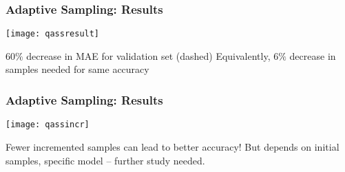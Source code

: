 \begin{frame}
    \frametitle{Adaptive Sampling: Results}
    \vspace{-10pt}
    \begin{center}
    \texttt{[image: qassresult]}
    \end{center}
    
    $60\%$ decrease in MAE for validation set (dashed) \newline
    Equivalently, $6\%$ decrease in samples needed for same accuracy

\end{frame}


\begin{frame}
    \frametitle{Adaptive Sampling: Results}
    \vspace{-10pt}
    \begin{center}
    \texttt{[image: qassincr]}
    \end{center}
    
    Fewer incremented samples can lead to better accuracy! \newline
    But depends on initial samples, specific model -- further study needed.

\end{frame}
